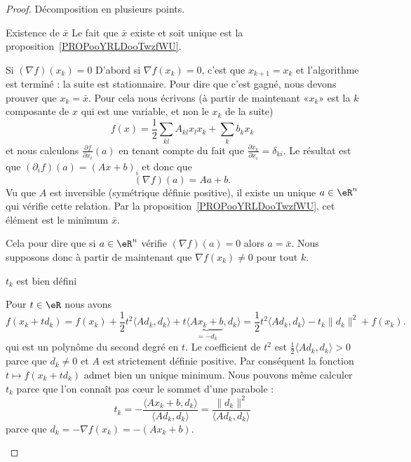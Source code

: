 \begin{proof}
    Décomposition en plusieurs points.
    \begin{subproof}
    \item[Existence de \( \bar x\)]
        Le fait que \( \bar x\) existe et soit unique est la proposition~\ref{PROPooYRLDooTwzfWU}.
    \item[Si \( (\nabla f)(x_k)=0\)]
    D'abord si \( \nabla f(x_k)=0\), c'est que \( x_{k+1}=x_k\) et l'algorithme est terminé : la suite est stationnaire. Pour dire que c'est gagné, nous devons prouver que \( x_k=\bar x\). Pour cela nous écrivons (à partir de maintenant «\( x_k\)» est la \( k\)\ieme composante de \( x\) qui est une variable, et non le \( x_k\) de la suite)
    \begin{equation}
        f(x)=\frac{ 1 }{2}\sum_{kl}A_{kl}x_lx_k+\sum_{k}b_kx_k
    \end{equation}
    et nous calculons \( \frac{ \partial f }{ \partial x_i }(a)\) en tenant compte du fait que \( \frac{ \partial x_k }{ \partial x_i }=\delta_{ki}\). Le résultat est que \( (\partial_if)(a)=(Ax+b)_i\) et donc que
    \begin{equation}
        (\nabla f)(a)=Aa+b.
    \end{equation}
    Vu que \( A\) est inversible (symétrique définie positive), il existe un unique \( a\in \eR^n\) qui vérifie cette relation. Par la proposition~\ref{PROPooYRLDooTwzfWU}, cet élément est le minimum \( \bar x\).

    Cela pour dire que si \( a\in \eR^n\) vérifie \( (\nabla f)(a)=0\) alors \( a=\bar x\). Nous supposons donc à partir de maintenant que \( \nabla f(x_k)\neq 0\) pour tout \( k\).
        \item[\( t_k\) est bien défini]

            Pour \( t\in \eR\) nous avons
            \begin{equation}    \label{EqKEHooYaazQi}
                f(x_k+td_k)=f(x_k)+\frac{ 1 }{2}t^2\langle Ad_k, d_k\rangle +t\langle \underbrace{Ax_k+b}_{=-d_k}, d_k\rangle=\frac{ 1 }{2}t^2\langle Ad_k, d_k\rangle -t_k\| d_k \|^2 +f(x_k).
            \end{equation}
            qui est un polynôme du second degré en \( t\). Le coefficient de \( t^2\) est \( \frac{ 1 }{2}\langle Ad_k, d_k\rangle >0\) parce que \( d_k\neq 0\) et \( A\) est strictement définie positive. Par conséquent la fonction \( t\mapsto f(x_k+td_k)\) admet bien un unique minimum. Nous pouvons même calculer \( t_k\) parce que l'on connaît pas cœur le sommet d'une parabole :
            \begin{equation}    \label{EqVWJooWmDSER}
                t_k=-\frac{ \langle Ax_k+b, d_k\rangle  }{ \langle Ad_k, d_k\rangle  }=\frac{ \| d_k \|^2 }{ \langle Ad_k, d_k\rangle  }
            \end{equation}
            parce que \( d_k=-\nabla f(x_k)=-(Ax_k+b)\).


\end{subproof}
\end{proof}
